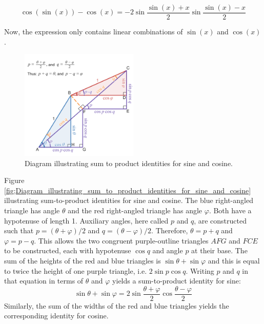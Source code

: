 \begin{equation*}
    \cos(\sin(x)) - \cos(x) = -2 \sin\frac{\sin(x) + x}{2} \sin\frac{\sin(x) - x}{2}
\end{equation*}

Now, the expression only contains linear combinations of 
$\sin(x)$ and $\cos(x)$.

\begin{figure}
    \centering
    \label{fig:Diagram_illustrating_sum_to_product_identities_for_sine_and_cosine}
    \includegraphics[width=0.5\textwidth]{figure/Diagram_illustrating_sum_to_product_identities_for_sine_and_cosine.png}
    \caption{Diagram illustrating sum to product identities for sine and cosine.}
\end{figure}

Figure \ref{fig;Diagram_illustrating_sum_to_product_identities_for_sine_and_cosine} 
illustrating sum-to-product identities for sine and cosine. 
The blue right-angled triangle has angle $\theta$ and the 
red right-angled triangle has angle $\varphi$. 
Both have a hypotenuse of length 1. Auxiliary angles, here called
$p$ and $q$, are constructed such that $p = (\theta + \varphi) / 2$ 
and $q = (\theta - \varphi) / 2$. Therefore, $\theta = p + q$
and $\varphi = p - q$.
This allows the two congruent purple-outline triangles
$AFG$ and $FCE$ to be constructed, 
each with hypotenuse $\cos q$ and angle $p$ at their base.
The sum of the heights of the red and blue triangles is
$\sin \theta + \sin \varphi$  and this is equal to 
twice the height of one purple triangle, 
i.e. $2 \sin p \cos q$. Writing $p$ and $q$ in that
equation in terms of $\theta$ and $\varphi$ yields 
a sum-to-product identity for sine:
\[
    \sin \theta + \sin \varphi = 2 \sin \dfrac{\theta + \varphi}{2} \cos \dfrac{\theta - \varphi}{2}
\]
Similarly, the sum of the widths of 
the red and blue triangles yields the corresponding identity for cosine.


